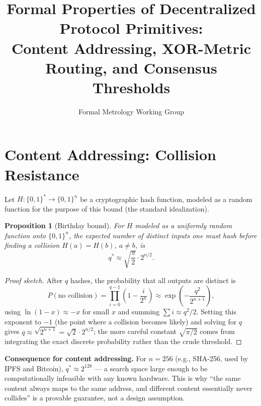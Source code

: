 \documentclass[10pt,journal,compsoc]{IEEEtran}
\newtheorem{proposition}{Proposition}
\begin{document}
\title{Formal Properties of Decentralized Protocol Primitives:\\ Content Addressing, XOR-Metric Routing, and Consensus Thresholds}
\author{Formal Metrology Working Group}


\maketitle

\section{Content Addressing: Collision Resistance}
Let $H:\{0,1\}^{*}\to\{0,1\}^n$ be a cryptographic hash function, modeled as a random function for the purpose of this bound (the standard idealization).

\begin{proposition}[Birthday bound]
For $H$ modeled as a uniformly random function onto $\{0,1\}^n$, the expected number of distinct inputs one must hash before finding a collision $H(a)=H(b)$, $a\ne b$, is
\begin{equation}
    q^{*} \approx \sqrt{\frac{\pi}{2}}\cdot 2^{n/2}.
\end{equation}
\end{proposition}
\begin{proof}[Proof sketch]
After $q$ hashes, the probability that all outputs are distinct is
\begin{equation}
    P(\text{no collision}) = \prod_{i=0}^{q-1}\left(1 - \frac{i}{2^n}\right) \approx \exp\left(-\frac{q^2}{2^{n+1}}\right),
\end{equation}
using $\ln(1-x)\approx -x$ for small $x$ and summing $\sum i \approx q^2/2$. Setting this exponent to $-1$ (the point where a collision becomes likely) and solving for $q$ gives $q \approx \sqrt{2^{n+1}} = \sqrt{2}\cdot 2^{n/2}$; the more careful constant $\sqrt{\pi/2}$ comes from integrating the exact discrete probability rather than the crude threshold.
\end{proof}
\textbf{Consequence for content addressing.} For $n=256$ (e.g., SHA-256, used by IPFS and Bitcoin), $q^* \approx 2^{128}$ — a search space large enough to be computationally infeasible with any known hardware. This is why ``the same content always maps to the same address, and different content essentially never collides'' is a provable guarantee, not a design assumption.
\end{document}
